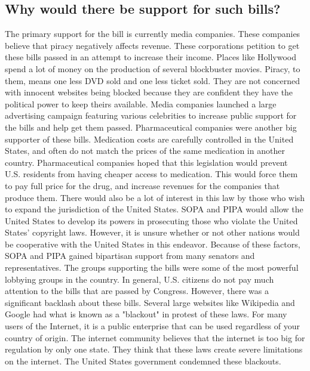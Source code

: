 \documentclass[11pt,journal,compsoc]{IEEEtran}
\begin{document}
\subsection{Why would there be support for such bills?}
The primary support for the bill is currently media companies. These companies believe that piracy negatively affects revenue. These corporations petition to get these bills passed in an attempt to increase their income. Places like Hollywood spend a lot of money on the production of several blockbuster movies. Piracy, to them, means one less DVD sold and one less ticket sold. They are not concerned with innocent websites being blocked because they are confident they have the political power to keep theirs available. Media companies launched a large advertising campaign featuring various celebrities to increase public support for the bills and help get them passed. 
\indent Pharmaceutical companies were another big supporter of these bills. Medication costs are carefully controlled in the United States, and often do not match the prices of the same medication in another country. Pharmaceutical companies hoped that this legislation would prevent U.S. residents from having cheaper access to medication. This would force them to pay full price for the drug, and increase revenues for the companies that produce them. 
\indent There would also be a lot of interest in this law by those who wish to expand the jurisdiction of the United States. SOPA and PIPA would allow the United States to develop its powers in prosecuting those who violate the United States' copyright laws. However, it is unsure whether or not other nations would be cooperative with the United States in this endeavor. 
\indent Because of these factors, SOPA and PIPA gained bipartisan support from many senators and representatives. The groups supporting the bills were some of the most powerful lobbying groups in the country. In general, U.S. citizens do not pay much attention to the bills that are passed by Congress. 
\indent However, there was a significant backlash about these bills. Several large websites like Wikipedia and Google had what is known as a "blackout" in protest of these laws. For many users of the Internet, it is a public enterprise that can be used regardless of your country of origin. The internet community believes that the internet is too big for regulation by only one state. They think that these laws create severe limitations on the internet. The United States government condemned these blackouts. 
\end{document}
